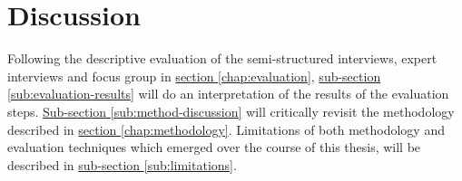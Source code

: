 \section{Discussion}
\label{chap:discussion}
Following the descriptive evaluation of the semi-structured interviews, expert interviews and focus group in \hyperref[chap:evaluation]{section \ref{chap:evaluation}}, \hyperref[sub:evaluation-results]{sub-section \ref{sub:evaluation-results}} will do an interpretation of the results of the evaluation steps. \hyperref[sub:method-discussion]{Sub-section \ref{sub:method-discussion}} will critically revisit the methodology described in \hyperref[chap:methodology]{section \ref{chap:methodology}}. Limitations of both methodology and evaluation techniques which emerged over the course of this thesis, will be described in \hyperref[sub:limitations]{sub-section \ref{sub:limitations}}.

